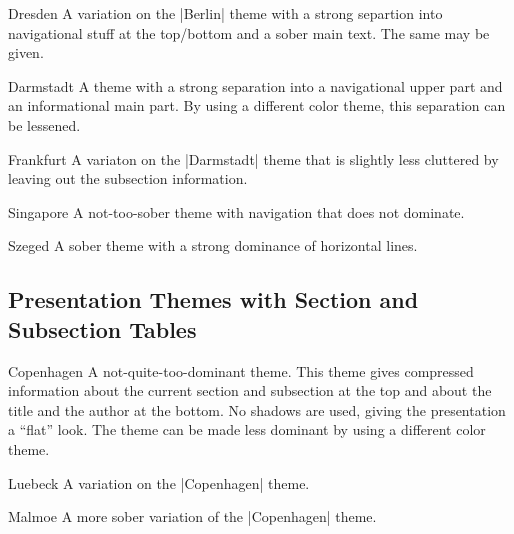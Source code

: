 \begin{themeexample}{Dresden}
  A variation on the |Berlin| theme with a strong separtion into
  navigational stuff at the top/bottom and a sober main text. The same
   may be given.  
\end{themeexample}


\begin{themeexample}{Darmstadt}
  A theme with a strong separation into a navigational upper part and
  an informational main part. By using a different color theme, this
  separation can be lessened. 
\end{themeexample}

\begin{themeexample}{Frankfurt}
  A variaton on the |Darmstadt| theme that is slightly less cluttered
  by leaving out the subsection information.
\end{themeexample}

\begin{themeexample}{Singapore}
  A not-too-sober theme with navigation that does not dominate.
\end{themeexample}

\begin{themeexample}{Szeged}
  A sober theme with a strong dominance of horizontal lines. 
\end{themeexample}




\subsection{Presentation Themes with Section and Subsection Tables}

\begin{themeexample}{Copenhagen}
  A not-quite-too-dominant theme. This theme gives compressed
  information about the current section and subsection at the top and
  about the title and the author at the bottom. No shadows are used,
  giving the presentation a ``flat'' look. The theme can be made less
  dominant by using a different color theme.
\end{themeexample}


\begin{themeexample}{Luebeck}
  A variation on the |Copenhagen| theme.
\end{themeexample}

\begin{themeexample}{Malmoe}
  A more sober variation of the |Copenhagen| theme.
\end{themeexample}


